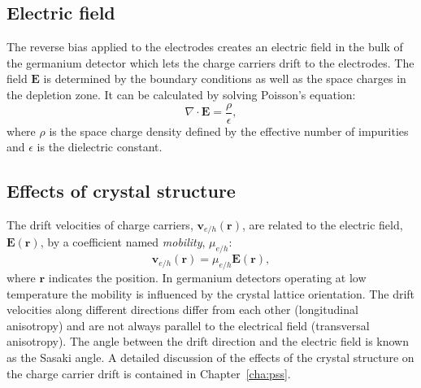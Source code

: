 \subsection{Electric field}
\label{sec:det:field}
The reverse bias applied to the electrodes creates an electric field in the bulk of the germanium detector which lets the charge carriers drift to the electrodes. The field $\mathbf{E}$ is determined by the boundary conditions as well as the space charges in the depletion zone. It can be calculated by solving Poisson's equation:
\begin{equation} 
  \label{eq:det:ef}
  \nabla \cdot \mathbf{E} = \frac{\rho}{\epsilon},  
\end{equation}
where $\rho$ is the space charge density defined by the effective number of impurities and $\epsilon$ is the dielectric constant.

\subsection{Effects of crystal structure}
\label{sec:det:struc}
The drift velocities of charge carriers, $\mathbf{v}_{e/h}(\mathbf{r})$, are related to the electric field, $\mathbf{E}(\mathbf{r})$, by a coefficient named \emph{mobility}, $\mu_{e/h}$:
\begin{equation} 
  \label{eq:det:dv}
  \mathbf{v}_{e/h} (\mathbf{r})= \mu_{e/h} \mathbf{E}(\mathbf{r}),
\end{equation}
where $\mathbf{r}$ indicates the position. In germanium detectors operating at low temperature the mobility is influenced by the crystal lattice orientation. The drift velocities along different directions differ from each other (longitudinal anisotropy) and are not always parallel to the electrical field (transversal anisotropy). The angle between the drift direction and the electric field is known as the Sasaki angle\cite{Sas56}. A detailed discussion of the effects of the crystal structure on the charge carrier drift is contained in Chapter~\ref{cha:pss}.


